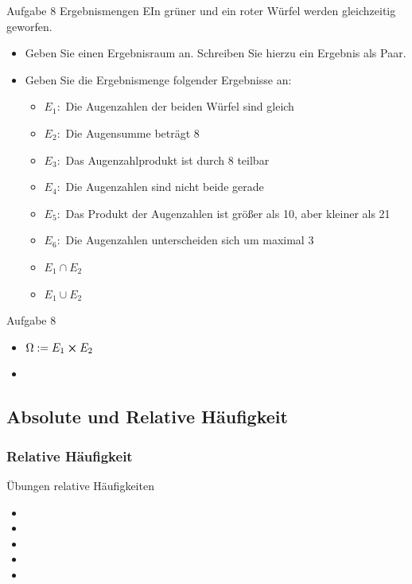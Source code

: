 \documentclass[11pt,a4paper,oneside]{article}
\begin{document}
	\newpage
	
	\begin{aufgabe}{Aufgabe 8 Ergebnismengen}
		EIn grüner und ein roter Würfel werden gleichzeitig geworfen. 
		\begin{itemize}
			\item Geben Sie einen Ergebnisraum an. Schreiben Sie hierzu ein Ergebnis als Paar.
			\item Geben Sie die Ergebnismenge folgender Ergebnisse an: 
			\begin{itemize}
				\item $E_1:$ Die Augenzahlen der beiden Würfel sind gleich 
				\item $E_2:$ Die Augensumme beträgt 8 
				\item $E_3:$ Das Augenzahlprodukt ist durch 8 teilbar 
				\item $E_4:$ Die Augenzahlen sind nicht beide gerade 
				\item $E_5:$ Das Produkt der Augenzahlen ist größer als 10, aber kleiner als 21
				\item $E_6:$ Die Augenzahlen unterscheiden sich um maximal 3
				\item $E_1 \cap E_2$
				\item $E_1 \cup E_2$
			\end{itemize}
		\end{itemize}
	\end{aufgabe}
	
	\begin{loesung}{Aufgabe 8}
		\begin{itemize}
			\item $\Omega := E_1 \cross E_2$
			\item 
		\end{itemize}
	\end{loesung}
	
	\newpage
	
	\subsection{Absolute und Relative Häufigkeit}
	
	\subsubsection{Relative Häufigkeit}
	
	\begin{aufgabe}{Übungen relative Häufigkeiten}
		\begin{itemize}[left=15mm]
			\item [Aufgabe 4]
			\item [Aufgabe 5]
			\item [Aufgabe 6]
			\item [Aufgabe 7]
			\item [Aufgabe 8]
		\end{itemize}
	\end{aufgabe}
	
\end{document}
